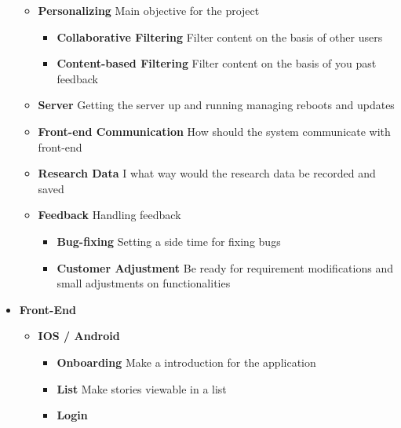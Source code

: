 \begin{appendices}
\begin{itemize}
\begin{itemize}
				\item \textbf{Personalizing } \newline
				Main objective for the project
				\begin{itemize}
					\item \textbf{Collaborative Filtering} \newline
					Filter content on the basis of other users
					\item \textbf{Content-based Filtering} \newline
					Filter content on the basis of you past feedback
				\end{itemize}
				\item \textbf{Server} \newline
				Getting the server up and running managing reboots and updates
				\item \textbf{Front-end Communication} \newline
				How should the system communicate with front-end
				\item \textbf{Research Data} \newline
				I what way would the research data be recorded and saved
				\item \textbf{Feedback} \newline
				Handling feedback
				\begin{itemize}
					\item \textbf{Bug-fixing} \newline
					Setting a side time for fixing bugs
					\item \textbf{Customer Adjustment} \newline
					Be ready for requirement modifications and small adjustments on functionalities
				\end{itemize}
			\end{itemize}
			\item \textbf{Front-End} \newline
			\begin{itemize}
				\item \textbf{IOS / Android} \newline
				\begin{itemize}
					\item \textbf{Onboarding} \newline
					Make a introduction for the application
					\item \textbf{List} \newline
					Make stories viewable in a list 
					\item \textbf{Login} \newline

\end{itemize}
\end{itemize}
\end{itemize}
\end{appendices}
